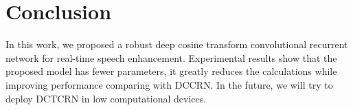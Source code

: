 \documentclass[journal,10pt]{IEEEtran}
\begin{document}
\section{Conclusion}
\label{sec:conclusion}

In this work, we proposed a robust deep cosine transform convolutional recurrent network for real-time speech enhancement. Experimental results show that the proposed model has fewer parameters, it greatly reduces the calculations while improving performance comparing with DCCRN. In the future, we will try to deploy DCTCRN in low computational devices.

\vfill\pagebreak



\end{document}
